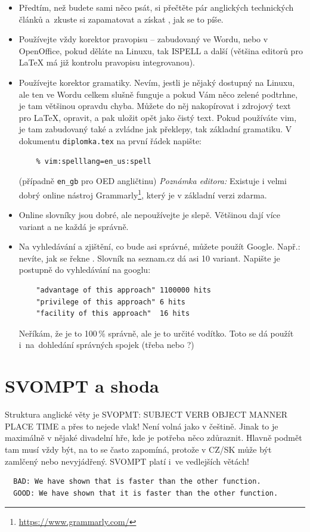\begin{itemize}
  \item{Předtím, než budete sami něco psát, si přečtěte pár anglických technických článků a~zkuste si zapamatovat a získat , jak se to píše.}
  \item{Používejte vždy korektor pravopisu -- zabudovaný ve Wordu, nebo v OpenOffice, pokud děláte na Linuxu, tak ISPELL a další (většina editorů pro \LaTeX{} má již kontrolu pravopisu integrovanou).}
  \item{Používejte korektor gramatiky. Nevím, jestli je nějaký dostupný na Linuxu, ale ten ve Wordu celkem slušně funguje a pokud Vám něco zelené podtrhne, je tam většinou opravdu chyba. Můžete do něj nakopírovat i zdrojový text pro \LaTeX{}, opravit, a pak uložit opět jako čistý text. Pokud používáte vim, je tam zabudovaný také a zvládne jak překlepy, tak základní gramatiku. V dokumentu \texttt{diplomka.tex} na první řádek napište: 
  \begin{verbatim}
    % vim:spelllang=en_us:spell
  \end{verbatim}
  (případně \texttt{en\_gb} pro OED angličtinu)
  \textit{Poznámka editora:} Existuje i velmi dobrý online nástroj Grammarly\footnote{\url{https://www.grammarly.com/}}, který je v základní verzi zdarma. 
  }
  \item{Online slovníky jsou dobré, ale nepoužívejte je slepě. Většinou dají více variant a ne každá je správně.}
  \item{\begin{samepage}Na vyhledávání a zjištění, co bude asi správné, můžete použít Google. Např.: nevíte, jak se řekne . Slovník na seznam.cz dá asi 10 variant. Napište je postupně do vyhledávání na googlu:
  \begin{verbatim}
    "advantage of this approach" 1100000 hits
    "privilege of this approach" 6 hits
    "facility of this approach"  16 hits
  \end{verbatim}
  Neříkám, že je to 100\,\% správně, ale je to určité vodítko. Toto se dá použít i~na~dohledání správných spojek (třeba  nebo ?)\end{samepage}}
\end{itemize}
       
\section*{SVOMPT a shoda}

Struktura anglické věty je SVOPMT: SUBJECT VERB OBJECT MANNER PLACE TIME a přes to nejede vlak! Není volná jako v češtině. Jinak to je maximálně v nějaké divadelní hře, kde je potřeba něco zdůraznit. Hlavně podmět tam musí vždy být, na to se často zapomíná, protože v CZ/SK může být zamlčený nebo nevyjádřený. SVOMPT platí i~ve vedlejších větách!
\begin{verbatim}
  BAD: We have shown that is faster than the other function. 
  GOOD: We have shown that it is faster than the other function. 
\end{verbatim}

